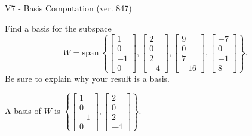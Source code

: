 \begin{exercise}
  \begin{exerciseTitle}V7 - Basis Computation (ver. 847)\end{exerciseTitle}
  \begin{exerciseStatement}
    Find a basis for the subspace 
\[W=\mathrm{span}\ \left\{\left[\begin{array}{r}
1 \\
0 \\
-1 \\
0
\end{array}\right] , \left[\begin{array}{r}
2 \\
0 \\
2 \\
-4
\end{array}\right] , \left[\begin{array}{r}
9 \\
0 \\
7 \\
-16
\end{array}\right] , \left[\begin{array}{r}
-7 \\
0 \\
-1 \\
8
\end{array}\right]\right\}.\]
 Be sure to explain why your result is a basis.


  \end{exerciseStatement}
  \begin{exerciseAnswer}
   A basis of \(W\) is  \(\left\{\left[\begin{array}{r}
1 \\
0 \\
-1 \\
0
\end{array}\right] , \left[\begin{array}{r}
2 \\
0 \\
2 \\
-4
\end{array}\right]\right\}\).
  


  \end{exerciseAnswer}
\end{exercise}